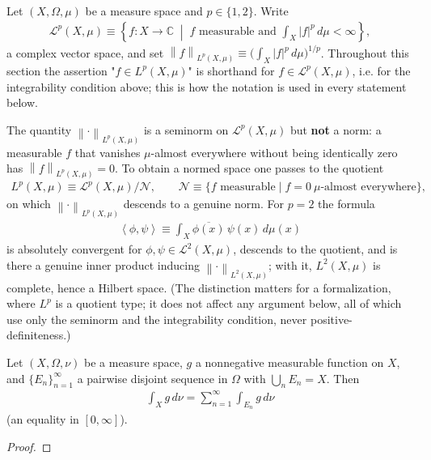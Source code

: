 \begin{definition}
    \label{def:hall-a.46}
    \leanok
    Let $(X,\Omega,\mu)$ be a measure space and $p \in \{1,2\}$. Write
    \begin{align}
        \mathcal{L}^p(X,\mu) \equiv \left\{ f : X \to \mathbb{C} \;\middle|\; f \text{ measurable and } \int_X \lvert f \rvert^p \, d\mu < \infty \right\},
    \end{align}
    a complex vector space, and set $\left\| f \right\|_{L^p(X,\mu)} \equiv \big( \int_X \lvert f \rvert^p \, d\mu \big)^{1/p}$. Throughout this section the assertion "$f \in L^p(X,\mu)$" is shorthand for $f \in \mathcal{L}^p(X,\mu)$, i.e. for the integrability condition above; this is how the notation is used in every statement below.

    The quantity $\left\| \cdot \right\|_{L^p(X,\mu)}$ is a seminorm on $\mathcal{L}^p(X,\mu)$ but \textbf{not} a norm: a measurable $f$ that vanishes $\mu$-almost everywhere without being identically zero has $\left\| f \right\|_{L^p(X,\mu)} = 0$. To obtain a normed space one passes to the quotient
    \begin{align}
        L^p(X,\mu) \equiv \mathcal{L}^p(X,\mu) \big/ \mathcal{N}, \qquad \mathcal{N} \equiv \{ f \text{ measurable} \mid f = 0 \ \mu\text{-almost everywhere} \},
    \end{align}
    on which $\left\| \cdot \right\|_{L^p(X,\mu)}$ descends to a genuine norm. For $p = 2$ the formula
    \begin{align}
        \left< \phi, \psi \right> \equiv \int_X \overline{\phi(x)} \, \psi(x) \, d\mu(x)
    \end{align}
    is absolutely convergent for $\phi,\psi \in \mathcal{L}^2(X,\mu)$, descends to the quotient, and is there a genuine inner product inducing $\left\| \cdot \right\|_{L^2(X,\mu)}$; with it, $L^2(X,\mu)$ is complete, hence a Hilbert space. (The distinction matters for a formalization, where $L^p$ is a quotient type; it does not affect any argument below, all of which use only the seminorm and the integrability condition, never positive-definiteness.)
\end{definition}

\begin{proposition}
    \label{prpstn:countable-additivity-of-the-integral}
    \leanok
    Let $(X,\Omega,\nu)$ be a measure space, $g$ a nonnegative measurable function on $X$, and $\{ E_n \}_{n=1}^\infty$ a pairwise disjoint sequence in $\Omega$ with $\bigcup_n E_n = X$. Then
    \begin{align}
        \int_X g \, d\nu = \sum_{n=1}^\infty \int_{E_n} g \, d\nu
    \end{align}
    (an equality in $[0,\infty]$).
\end{proposition}
\begin{proof}
\leanok
\end{proof}

